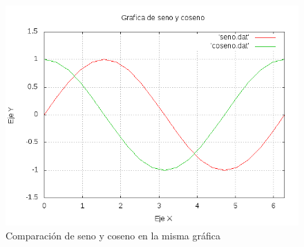 \documentclass[12pt,a4paper,openright]{article}
\begin{document}
\begin{figure}[htb]

\includegraphics[scale=1]{senoycoseno.png} 
\caption{Comparación de seno y coseno en la misma gráfica}
\end{figure}
\end{document}
